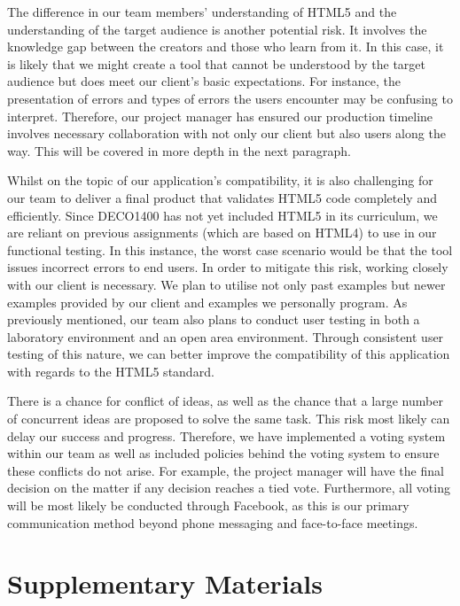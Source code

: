 \documentclass[12pt]{article}
\begin{document}
The difference in our team members' understanding of HTML5 and the understanding of the target audience is another potential risk. It involves the knowledge gap between the creators and those who learn from it. In this case, it is likely that we might create a tool that cannot be understood by the target audience but does meet our client's basic expectations. For instance, the presentation of errors and types of errors the users encounter may be confusing to interpret. Therefore, our project manager has ensured our production timeline involves necessary collaboration with not only our client but also users along the way. This will be covered in more depth in the next paragraph.

Whilst on the topic of our application's compatibility, it is also challenging for our team to deliver a final product that validates HTML5 code completely and efficiently. Since DECO1400 has not yet included HTML5 in its curriculum, we are reliant on previous assignments (which are based on HTML4) to use in our functional testing. In this instance, the worst case scenario would be that the tool issues incorrect errors to end users. In order to mitigate this risk, working closely with our client is necessary. We plan to utilise not only past examples but newer examples provided by our client and examples we personally program. As previously mentioned, our team also plans to conduct user testing in both a laboratory environment and an open area environment. Through consistent user testing of this nature, we can better improve the compatibility of this application with regards to the HTML5 standard.

There is a chance for conflict of ideas, as well as the chance that a large number of concurrent ideas are proposed to solve the same task. This risk most likely can delay our success and progress. Therefore, we have implemented a voting system within our team as well as included policies behind the voting system to ensure these conflicts do not arise. For example, the project manager will have the final decision on the matter if any decision reaches a tied vote. Furthermore, all voting will be most likely be conducted through Facebook, as this is our primary communication method beyond phone messaging and face-to-face meetings.

\newpage
\section*{Supplementary Materials}
\end{document}
